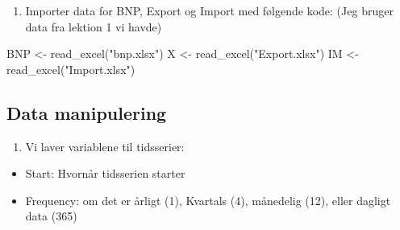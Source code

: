 \documentclass[
  12pt,
]{article}
\newenvironment{Shaded}{\begin{snugshade}}{\end{snugshade}}
\newcommand{\AttributeTok}[1]{\textcolor[rgb]{0.77,0.63,0.00}{#1}}
\newcommand{\DecValTok}[1]{\textcolor[rgb]{0.00,0.00,0.81}{#1}}
\newcommand{\FunctionTok}[1]{\textcolor[rgb]{0.00,0.00,0.00}{#1}}
\newcommand{\NormalTok}[1]{#1}
\newcommand{\OtherTok}[1]{\textcolor[rgb]{0.56,0.35,0.01}{#1}}
\newcommand{\SpecialCharTok}[1]{\textcolor[rgb]{0.00,0.00,0.00}{#1}}
\newcommand{\StringTok}[1]{\textcolor[rgb]{0.31,0.60,0.02}{#1}}
\providecommand{\tightlist}{%
  \setlength{\itemsep}{0pt}\setlength{\parskip}{0pt}}
\begin{document}
\begin{enumerate}
\def\labelenumi{\arabic{enumi}.}
\tightlist
\item
  Importer data for BNP, Export og Import med følgende kode: (Jeg bruger
  data fra lektion 1 vi havde)
\end{enumerate}

\begin{Shaded}
\begin{Highlighting}[]
\NormalTok{BNP }\OtherTok{\textless{}{-}} \FunctionTok{read\_excel}\NormalTok{(}\StringTok{"bnp.xlsx"}\NormalTok{)}
\NormalTok{X }\OtherTok{\textless{}{-}} \FunctionTok{read\_excel}\NormalTok{(}\StringTok{"Export.xlsx"}\NormalTok{)}
\NormalTok{IM }\OtherTok{\textless{}{-}} \FunctionTok{read\_excel}\NormalTok{(}\StringTok{"Import.xlsx"}\NormalTok{)}
\end{Highlighting}
\end{Shaded}

\hypertarget{data-manipulering}{%
\subsection{Data manipulering}\label{data-manipulering}}

\begin{enumerate}
\def\labelenumi{\arabic{enumi}.}
\tightlist
\item
  Vi laver variablene til tidsserier:
\end{enumerate}

\begin{itemize}
\tightlist
\item
  Start: Hvornår tidsserien starter
\item
  Frequency: om det er årligt (1), Kvartals (4), månedelig (12), eller
  dagligt data (365)
\end{itemize}

\begin{Shaded}
\end{Shaded}
\end{document}
